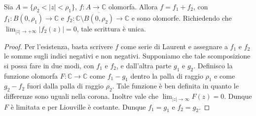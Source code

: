 \begin{cor}
    Sia $A = \{\rho_2<|z|<\rho_1\}$, $f:A\rightarrow \mathbb{C}$ olomorfa.
    Allora $f = f_1 + f_2$, con $f_1:B(0,\rho_1)\rightarrow\mathbb{C}$ e $f_2:
    \mathbb{C}\setminus \overline{B(0,\rho_2)}\rightarrow\mathbb{C}$ e sono
    olomorfe. Richiedendo che $\lim_{|z|\rightarrow +\infty} |f_2(z)| = 0$,
    tale scrittura \`e unica.
\end{cor}
\begin{proof}
    Per l'esistenza, basta scrivere $f$ come serie di Laurent e assegnare a
    $f_1$ e $f_2$ le somme sugli indici negativi e non negativi.
    Supponiamo che tale scomposizione si possa fare in due modi, con $f_1$ e
    $f_2$, e dall'altra parte $g_1$ e $g_2$.
    Definisco la funzione olomorfa $F:\mathbb{C}\rightarrow\mathbb{C}$ come 
    $f_1-g_1$ dentro la palla di raggio $\rho_1$ e come $g_2-f_2$ fuori dalla
    palla di raggio $\rho_2$. Tale funzione \`e ben definita in quanto le
    differenze sono uguali nella corona. Inoltre vale che $\lim_{|z|\rightarrow
    \infty} F(z) = 0$. Dunque $F$ \`e limitata e per Liouville \`e costante.
    Dunque $f_1=g_1$ e $f_2 = g_2$.
\end{proof}
